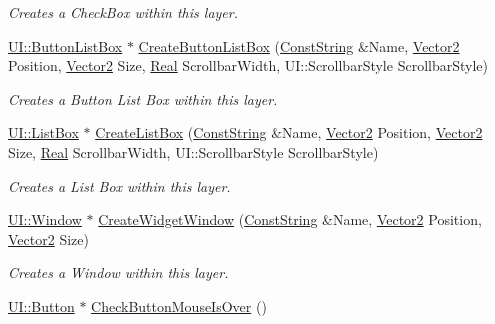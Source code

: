 \begin{DoxyCompactItemize}
\begin{DoxyCompactList}\small\item\em Creates a CheckBox within this layer. \item\end{DoxyCompactList}\item 
\hyperlink{classphys_1_1UI_1_1ButtonListBox}{UI::ButtonListBox} $\ast$ \hyperlink{classphys_1_1UILayer_aa5634ff2ed12c4168dc3c49ac601b933}{CreateButtonListBox} (\hyperlink{namespacephys_a5ce5049f8b4bf88d6413c47b504ebb31}{ConstString} \&Name, \hyperlink{classphys_1_1Vector2}{Vector2} Position, \hyperlink{classphys_1_1Vector2}{Vector2} Size, \hyperlink{namespacephys_af7eb897198d265b8e868f45240230d5f}{Real} ScrollbarWidth, UI::ScrollbarStyle ScrollbarStyle)
\begin{DoxyCompactList}\small\item\em Creates a Button List Box within this layer. \item\end{DoxyCompactList}\item 
\hyperlink{classphys_1_1UI_1_1ListBox}{UI::ListBox} $\ast$ \hyperlink{classphys_1_1UILayer_ac0901ce99a6fa2e3f4c2b8a44239349e}{CreateListBox} (\hyperlink{namespacephys_a5ce5049f8b4bf88d6413c47b504ebb31}{ConstString} \&Name, \hyperlink{classphys_1_1Vector2}{Vector2} Position, \hyperlink{classphys_1_1Vector2}{Vector2} Size, \hyperlink{namespacephys_af7eb897198d265b8e868f45240230d5f}{Real} ScrollbarWidth, UI::ScrollbarStyle ScrollbarStyle)
\begin{DoxyCompactList}\small\item\em Creates a List Box within this layer. \item\end{DoxyCompactList}\item 
\hyperlink{classphys_1_1UI_1_1Window}{UI::Window} $\ast$ \hyperlink{classphys_1_1UILayer_aaf8ca5a901a7300c63311be66309c6d7}{CreateWidgetWindow} (\hyperlink{namespacephys_a5ce5049f8b4bf88d6413c47b504ebb31}{ConstString} \&Name, \hyperlink{classphys_1_1Vector2}{Vector2} Position, \hyperlink{classphys_1_1Vector2}{Vector2} Size)
\begin{DoxyCompactList}\small\item\em Creates a Window within this layer. \item\end{DoxyCompactList}\item 
\hyperlink{classphys_1_1UI_1_1Button}{UI::Button} $\ast$ \hyperlink{classphys_1_1UILayer_ac28c19dea53d2b89c5c09a2e29ce8c6d}{CheckButtonMouseIsOver} ()

\end{DoxyCompactItemize}
